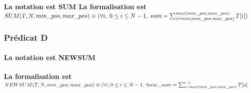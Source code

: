 \paragraph{La notation est SUM \newline \newline
La formalisation est $SUM(T,N,min\_pos,max\_pos) \equiv \newline
(\forall i,\; 0\leq i \leq N-1,\;sum = \sum_{i=min(min\_pos,max\_pos)}^{max(min\_pos, max\_pos)} T[i])$}
\newline \newline
\subsubsection{Prédicat D}
\paragraph{La notation est NEWSUM} \newline \newline
\paragraph{La formalisation est $NEWSUM(T,N,min\_pos, max\_pos) \equiv 
\newline
(\forall i, 0 \leq i \leq N-1,\exists new\_sum = \sum_{a = max(min\_pos,max\_pos)}^{i-1} T[a]$}




